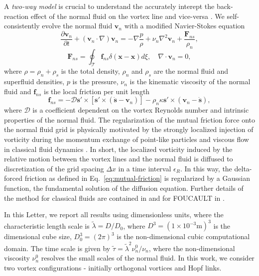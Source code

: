 \documentclass[%
superscriptaddress,
 amsmath,amssymb,
prl,
prb,
]{revtex4-2}
\def \s{\mathbf{s}}
\def \v{\mathbf{v}}
\def \x{\mathbf{x}}
\begin{document}
A \emph{two-way model} is crucial to understand the accurately interept the back-reaction effect of the normal fluid on the vortex line and vice-versa \cite{stasiakCrossComponentEnergyTransfer2024}. We self-consistently evolve the normal fluid $\v_n$ with a modified Navier-Stokes equation
\begin{equation}
	\frac{\partial \v_n}{\partial t} + (\v_n\cdot\nabla)\v_n = -\nabla\frac{p}{\rho} + \nu_n\nabla^2\v_n + \frac{\mathbf{F}_{ns}}{\rho_n},
\end{equation}
\begin{equation}
	\mathbf{F}_{ns} = \oint_{\mathcal{T}}\mathbf{f}_{ns}\delta(\x-\x)d\xi, \quad \nabla\cdot\v_n=0,
\end{equation}
where $\rho=\rho_n + \rho_s$ is the total density, $\rho_n$ and $\rho_s$ are the normal fluid and superfluid densities, $p$ is the pressure, $\nu_n$ is the kinematic viscosity of the normal fluid and $\mathbf{f}_{ns}$ is the local friction per unit length \cite{galantucciCoupledNormalFluid2015a}
\begin{equation}
	\mathbf{f}_{ns} = -\mathcal{D}\s'\times\left[\s'\times(\dot{\s}-\v_n)\right]-\rho_n\kappa\s'\times(\v_n-\dot{\s}), 
	\label{eq:mutual-friction}
\end{equation}
where $\mathcal{D}$ is a coefficient dependent on the vortex Reynolds number and intrinsic properties of the normal fluid. The regularization of the mutual friction force onto the normal fluid grid is physically motivated by the strongly localized injection of vorticity during the momentum exchange of point-like particles and viscous flow in classical fluid dynamics \cite{gualtieri2015exact,gualtieri2017turbulence}. In short, the localized vorticity induced by the relative motion between the vortex lines and the normal fluid is diffused to discretization of the grid spacing $\Delta x$ in a time interval $\epsilon_R$. In this way, the delta-forced friction as defined in Eq.~\ref{eq:mutual-friction} is regularized by a Gaussian function, the fundamental solution of the diffusion equation. Further details of the method for classical fluids are contained in \cite{gualtieri2015exact,gualtieri2017turbulence} and for FOUCAULT in \cite{galantucciNewSelfconsistentApproach2020b}.  

In this Letter, we report all results using dimensionless units, where the characteristic length scale is $\tilde{\lambda} = D/D_0$, where $D^3=(1\times10^{-3}\mathrm{m})^3$ is the dimensional cube size, $D_0^3=(2\pi)^3$ is the non-dimensional cubic computational domain. The time scale is given by $\tilde{\tau}=\tilde{\lambda}^2\nu_n^0/\nu_n$, where the non-dimensional viscosity $\nu_n^0$ resolves the small scales of the normal fluid. In this work, we consider two vortex configurations - initially orthogonal vortices and Hopf links.\\
\end{document}
